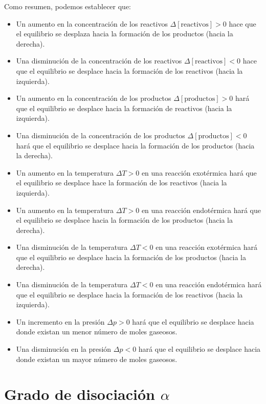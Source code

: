    Como resumen, podemos establecer que:
    \begin{itemize}
        \item Un aumento en la concentración de los reactivos \( \Delta [\text{reactivos}] > 0 \) hace que el equilibrio se desplaza hacia la formación de los productos (hacia la derecha).
        \item Una disminución de la concentración de los reactivos \( \Delta [\text{reactivos}] < 0 \) hace que el equilibrio se desplace hacia la formación de los reactivos (hacia la izquierda).
        \item Un aumento en la concentración de los productos \( \Delta [\text{productos}] > 0 \) hará que el equilibrio se desplace hacia la formación de reactivos (hacia la izquierda).
        \item Una disminución de la concentración de los productos \( \Delta [\text{productos}] < 0 \) hará que el equilibrio se desplace hacia la formación de los productos (hacia la derecha).
        \item Un aumento en la temperatura \( \Delta T > 0 \) en una reacción exotérmica hará que el equilibrio se desplace hace la formación de los reactivos (hacia la izquierda).
        \item Un aumento en la temperatura \( \Delta T > 0 \) en una reacción endotérmica hará que el equilibrio se desplace hacia la formación de los productos (hacia la derecha).
        \item Una disminución de la temperatura \( \Delta T < 0 \) en una reacción exotérmica hará que el equilibrio se desplace hacia la formación de los productos (hacia la derecha).
        \item Una disminución de la temperatura \( \Delta T < 0 \) en una reacción endotérmica hará que el equilibrio se desplace hacia la formación de los reactivos (hacia la izquierda).
        \item Un incremento en la presión \( \Delta p > 0 \) hará que el equilibrio se desplace hacia donde existan un menor número de moles gaseosos.
        \item Una disminución en la presión \( \Delta p < 0 \) hará que el equilibrio se desplace hacia donde existan un mayor número de moles gaseosos.
    \end{itemize}


    \section{Grado de disociación \texorpdfstring{\( \alpha \)}{alfa}}\label{sec:grado-de-disociacion}
    \setcounter{ejemplo}{0}


